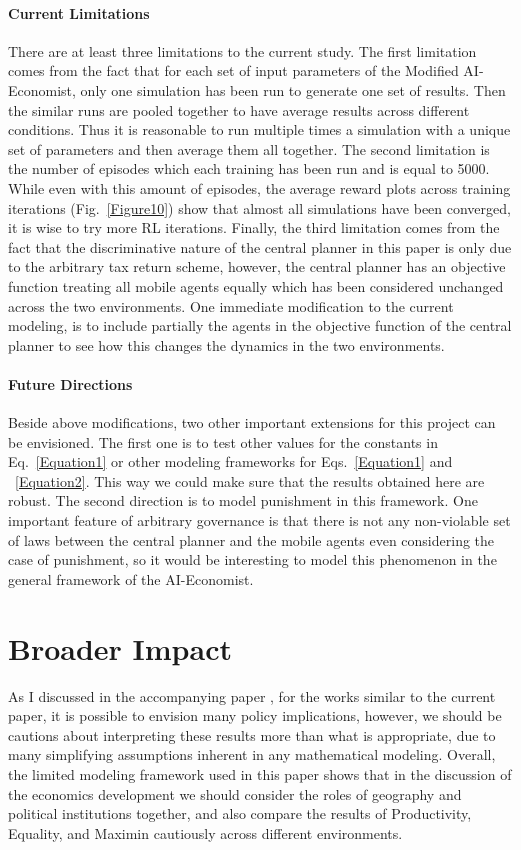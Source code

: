\documentclass{article}
\begin{document}
\paragraph{Current Limitations} There are at least three limitations to the current study. The first limitation comes from the fact that for each set of input parameters of the Modified AI-Economist, only one simulation has been run to generate one set of results. Then the similar runs are pooled together to have average results across different conditions. Thus it is reasonable to run multiple times a simulation with a unique set of parameters and then average them all together. The second limitation is the number of episodes which each training has been run and is equal to 5000. While even with this amount of episodes, the average reward plots across training iterations (Fig.~\ref{Figure10}) show that almost all simulations have been converged, it is wise to try more RL iterations. Finally, the third limitation comes from the fact that the discriminative nature of the central planner in this paper is only due to the arbitrary tax return scheme, however, the central planner has an objective function treating all mobile agents equally which has been considered unchanged across the two environments. One immediate modification to the current modeling, is to include partially the agents in the objective function of the central planner to see how this changes the dynamics in the two environments.

\paragraph{Future Directions} Beside above modifications, two other important extensions for this project can be envisioned. The first one is to test other values for the constants in Eq.~\ref{Equation1} or other modeling frameworks for Eqs.~\ref{Equation1} and ~\ref{Equation2}. This way we could make sure that the results obtained here are robust. The second direction is to model punishment in this framework. One important feature of arbitrary governance is that there is not any non-violable set of laws between the central planner and the mobile agents even considering the case of punishment, so it would be interesting to model this phenomenon in the general framework of the AI-Economist.

\section*{Broader Impact}
As I discussed in the accompanying paper \citep{Dizaji2023a}, for the works similar to the current paper, it is possible to envision many policy implications, however, we should be cautions about interpreting these results more than what is appropriate, due to many simplifying assumptions inherent in any mathematical modeling. Overall, the limited modeling framework used in this paper shows that in the discussion of the economics development we should consider the roles of geography and political institutions together, and also compare the results of Productivity, Equality, and Maximin cautiously across different environments. 
\end{document}
